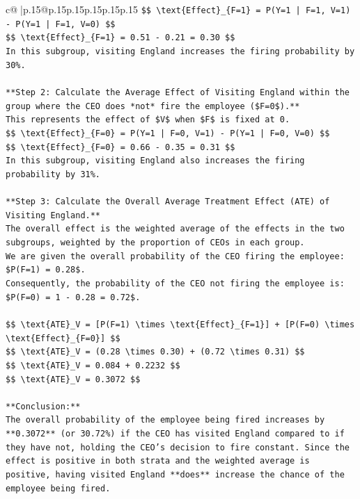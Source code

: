 \documentclass{article}
\begin{document}
{\begin{supertabular}{c@{$\;$}|p{.15\linewidth}@{}p{.15\linewidth}p{.15\linewidth}p{.15\linewidth}p{.15\linewidth}p{.15\linewidth}}
{{{\texttt{\$\$ \textbackslash{}text\{Effect\}\_\{F=1\} = P(Y=1 | F=1, V=1) {-} P(Y=1 | F=1, V=0) \$\$} \\
\texttt{\$\$ \textbackslash{}text\{Effect\}\_\{F=1\} = 0.51 {-} 0.21 = 0.30 \$\$} \\
\texttt{In this subgroup, visiting England increases the firing probability by 30\%.} \\
\\ 
\texttt{**Step 2: Calculate the Average Effect of Visiting England within the group where the CEO does *not* fire the employee (\$F=0\$).**} \\
\texttt{This represents the effect of \$V\$ when \$F\$ is fixed at 0.} \\
\texttt{\$\$ \textbackslash{}text\{Effect\}\_\{F=0\} = P(Y=1 | F=0, V=1) {-} P(Y=1 | F=0, V=0) \$\$} \\
\texttt{\$\$ \textbackslash{}text\{Effect\}\_\{F=0\} = 0.66 {-} 0.35 = 0.31 \$\$} \\
\texttt{In this subgroup, visiting England also increases the firing probability by 31\%.} \\
\\ 
\texttt{**Step 3: Calculate the Overall Average Treatment Effect (ATE) of Visiting England.**} \\
\texttt{The overall effect is the weighted average of the effects in the two subgroups, weighted by the proportion of CEOs in each group.} \\
\texttt{We are given the overall probability of the CEO firing the employee: \$P(F=1) = 0.28\$.} \\
\texttt{Consequently, the probability of the CEO not firing the employee is: \$P(F=0) = 1 {-} 0.28 = 0.72\$.} \\
\\ 
\texttt{\$\$ \textbackslash{}text\{ATE\}\_V = {[}P(F=1) \textbackslash{}times \textbackslash{}text\{Effect\}\_\{F=1\}{]} + {[}P(F=0) \textbackslash{}times \textbackslash{}text\{Effect\}\_\{F=0\}{]} \$\$} \\
\texttt{\$\$ \textbackslash{}text\{ATE\}\_V = (0.28 \textbackslash{}times 0.30) + (0.72 \textbackslash{}times 0.31) \$\$} \\
\texttt{\$\$ \textbackslash{}text\{ATE\}\_V = 0.084 + 0.2232 \$\$} \\
\texttt{\$\$ \textbackslash{}text\{ATE\}\_V = 0.3072 \$\$} \\
\\ 
\texttt{**Conclusion:**} \\
\texttt{The overall probability of the employee being fired increases by **0.3072** (or 30.72\%) if the CEO has visited England compared to if they have not, holding the CEO's decision to fire constant. Since the effect is positive in both strata and the weighted average is positive, having visited England **does** increase the chance of the employee being fired.} \\
}}}
\end{supertabular}}
\end{document}
